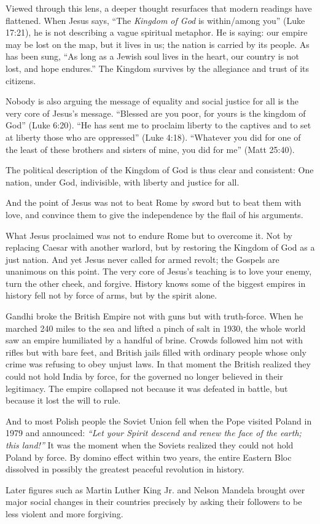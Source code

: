 Viewed through this lens, a deeper thought resurfaces that modern readings have flattened.
When Jesus says, ``The \emph{Kingdom of God} is within/among you'' (Luke 17:21), he is not describing a vague spiritual metaphor.
He is saying: our empire may be lost on the map, but it lives in us; the nation is carried by its people.
As has been sung, ``As long as a Jewish soul lives in the heart, our country is not lost, and hope endures.''
The Kingdom survives by the allegiance and trust of its citizens.

Nobody is also arguing the message of equality and social justice for all is the very core of Jesus’s message.
“Blessed are you poor, for yours is the kingdom of God” (Luke 6:20).
“He has sent me to proclaim liberty to the captives and to set at liberty those who are oppressed” (Luke 4:18).
“Whatever you did for one of the least of these brothers and sisters of mine, you did for me” (Matt 25:40).

The political description of the Kingdom of God is thus clear and consistent:
One nation, under God, indivisible, with liberty and justice for all.

And the point of Jesus was not to beat Rome by sword but to beat them with love,
and convince them to give the independence by the flail of his arguments.

What Jesus proclaimed was not to endure Rome but to overcome it.
Not by replacing Caesar with another warlord, but by restoring the Kingdom of God as a just nation.
And yet Jesus never called for armed revolt; the Gospels are unanimous on this point.
The very core of Jesus’s teaching is to love your enemy, turn the other cheek, and forgive.
History knows some of the biggest empires in history fell not by force of arms, but by the spirit alone.

Gandhi broke the British Empire not with guns but with truth-force.
When he marched 240 miles to the sea and lifted a pinch of salt in 1930, the whole world saw an empire humiliated by a handful of brine.
Crowds followed him not with rifles but with bare feet, and British jails filled with ordinary people whose only crime was refusing to obey unjust laws.
In that moment the British realized they could not hold India by force, for the governed no longer believed in their legitimacy.
The empire collapsed not because it was defeated in battle, but because it lost the will to rule.

And to most Polish people the Soviet Union fell when the Pope visited Poland in 1979 and announced:
\emph{“Let your Spirit descend and renew the face of the earth; this land!”}
It was the moment when the Soviets realized they could not hold Poland by force.
By domino effect within two years, the entire Eastern Bloc dissolved in possibly the greatest peaceful revolution in history.

Later figures such as Martin Luther King Jr. and Nelson Mandela brought over major social changes in their countries precisely by asking their followers to be less violent and more forgiving.


